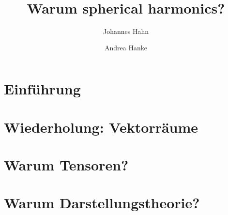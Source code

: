 \documentclass[fontsize=11pt,fleqn,a4paper]{scrartcl}
\author{Johannes Hahn \and Andrea Hanke}
\title{Warum spherical harmonics?}
\begin{document}
\maketitle

\tableofcontents

\setcounter{section}{-1}
\section{Einführung}

\section{Wiederholung: Vektorräume}

\section{Warum Tensoren?}


\section{Warum Darstellungstheorie?}
\end{document}
